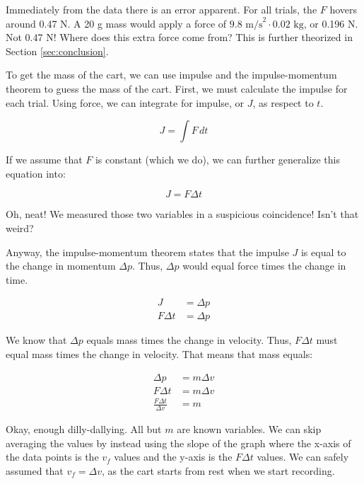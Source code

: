 \documentclass[twocolumn]{article}
\begin{document}
Immediately from the data there is an error apparent. For all trials, the $F$
hovers around 0.47 N. A 20 g mass would apply a force of $9.8 \mbox{ m/s}^2
\cdot 0.02 \mbox{ kg}$, or 0.196 N. Not 0.47 N! Where does this extra force come
from? This is further theorized in Section \ref{sec:conclusion}.

To get the mass of the cart, we can use impulse and the impulse-momentum theorem
to guess the mass of the cart. First, we must calculate the impulse for each
trial. Using force, we can integrate for impulse, or $J$, as respect to $t$.

\begin{equation*}
    J = \int F \,dt
\end{equation*}

If we assume that $F$ is constant (which we do), we can further generalize this
equation into:

\begin{equation*}
    J = F\Delta t
\end{equation*}

Oh, neat! We measured those two variables in a suspicious coincidence! Isn't
that weird?

Anyway, the impulse-momentum theorem states that the impulse $J$ is
equal to the change in momentum $\Delta p$. Thus, $\Delta p$ would equal force
times the change in time.

\begin{align*}
    J &= \Delta p \\
    F \Delta t &= \Delta p
\end{align*}

We know that $\Delta p$ equals mass times the change in velocity. Thus, $F\Delta
t$ must equal mass times the change in velocity. That means that mass equals:

\begin{align*}
    \Delta p &= m \Delta v \\
    F \Delta t &= m \Delta v \\
    \frac{F \Delta t}{\Delta v} &= m
\end{align*}

Okay, enough dilly-dallying. All but $m$ are known variables. We can skip
averaging the values by instead using the slope of the graph where the x-axis of
the data points is the $v_f$ values and the y-axis is the $F \Delta t$
values. We can safely assumed that $v_f = \Delta v$, as the cart starts from
rest when we start recording.
\end{document}
